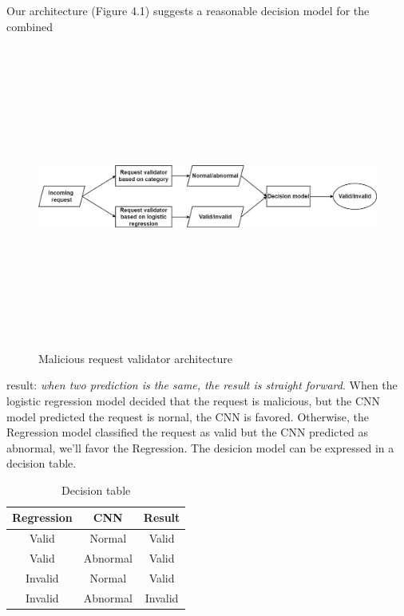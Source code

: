 \hspace{0.5cm}Our architecture (Figure 4.1) suggests a reasonable decision model for the combined 
\begin{figure}[!h]
   
     \centering
     \includegraphics[width=\linewidth, height=10cm,keepaspectratio]{figures/architecture2.1.png}
   \caption{Malicious request validator architecture}
\end{figure}
result: \emph{when two prediction is the same, the result is straight forward}. When the logistic regression model decided that the request is malicious, but the CNN model predicted the request is nornal, the CNN is favored. Otherwise, the Regression model classified the request as valid but the CNN predicted as abnormal, we'll favor the Regression. The desicion model can be expressed in a decision table. \\

\begin{table}[h]
\begin{center}
\begin{tabular}{||c c c ||} 
 \hline
 \textbf{Regression} & \textbf{CNN} & \textbf{Result}  \\ [0.5ex] 
 \hline\hline
 Valid & Normal & Valid \\ 
 
 Valid & Abnormal & Valid  \\

 Invalid & Normal & Valid  \\
 
 Invalid & Abnormal & Invalid  \\ [1ex] 
\hline
\end{tabular}
\end{center}
\caption{\label{demo-table} Decision table}
\end{table}

